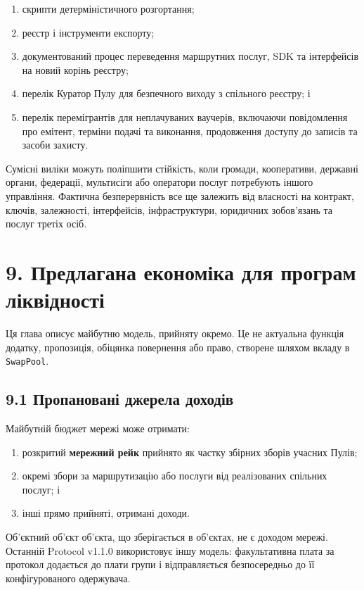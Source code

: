 \documentclass[11pt]{article}
\begin{document}
\begin{enumerate}[leftmargin=*]
\item скрипти детерміністичного розгортання;
\item реєстр і інструменти експорту;
\item документований процес переведення маршрутних послуг, SDK та інтерфейсів на новий корінь реєстру;
\item перелік Куратор Пулу для безпечного виходу з спільного реєстру; і
\item перелік перемігрантів для неплачуваних ваучерів, включаючи повідомлення про емітент, терміни подачі та виконання, продовження доступу до записів та засоби захисту.
\end{enumerate}
Сумісні виліки можуть поліпшити стійкість, коли громади, кооперативи, державні органи, федерації, мультисіги або оператори послуг потребують іншого управління. Фактична безперервність все ще залежить від власності на контракт, ключів, залежності, інтерфейсів, інфраструктури, юридичних зобов'язань та послуг третіх осіб.


\section*{9. Предлагана економіка для програм ліквідності}

Ця глава описує майбутню модель, прийняту окремо. Це не актуальна функція додатку, пропозиція, обіцянка повернення або право, створене шляхом вкладу в \texttt{SwapPool}.

\subsection*{9.1 Пропановані джерела доходів}

Майбутній бюджет мережі може отримати:

\begin{enumerate}[leftmargin=*]
\item розкритий \textbf{мережний рейк} прийнято як частку збірних зборів учасних Пулів;
\item окремі збори за маршрутизацію або послуги від реалізованих спільних послуг; і
\item інші прямо прийняті, отримані доходи.
\end{enumerate}
Об'єктний об'єкт об'єкта, що зберігається в об'єктах, не є доходом мережі. Останній Protocol v1.1.0 використовує іншу модель: факультативна плата за протокол додається до плати групи і відправляється безпосередньо до її конфігурованого одержувача.
\end{document}
